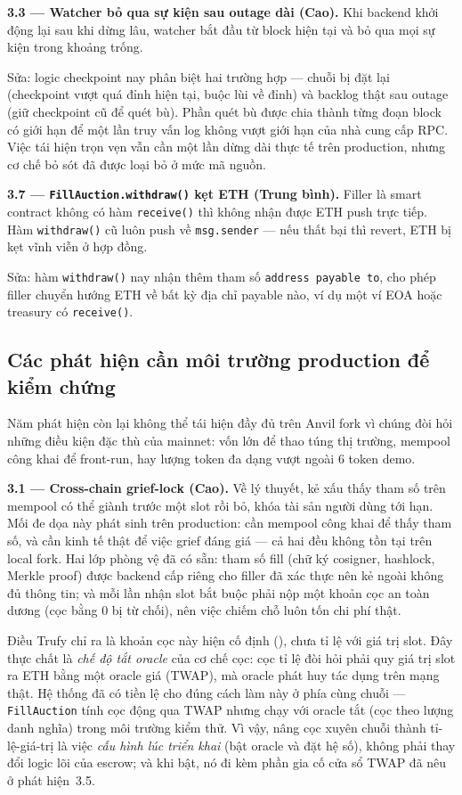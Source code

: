 \documentclass[../DoAn.tex]{subfiles}
\begin{document}
\textbf{3.3 --- Watcher bỏ qua sự kiện sau outage dài (Cao).}
Khi backend khởi động lại sau khi dừng lâu, watcher bắt đầu từ block hiện tại và bỏ qua mọi sự kiện trong khoảng trống.

Sửa: logic checkpoint nay phân biệt hai trường hợp --- chuỗi bị đặt lại (checkpoint vượt quá đỉnh hiện tại, buộc lùi về đỉnh) và backlog thật sau outage (giữ checkpoint cũ để quét bù). Phần quét bù được chia thành từng đoạn block có giới hạn để một lần truy vấn log không vượt giới hạn của nhà cung cấp RPC. Việc tái hiện trọn vẹn vẫn cần một lần dừng dài thực tế trên production, nhưng cơ chế bỏ sót đã được loại bỏ ở mức mã nguồn.

\textbf{3.7 --- \texttt{FillAuction.withdraw()} kẹt ETH (Trung bình).}
Filler là smart contract không có hàm \texttt{receive()} thì không nhận được ETH push trực tiếp. Hàm \texttt{withdraw()} cũ luôn push về \texttt{msg.sender} --- nếu thất bại thì revert, ETH bị kẹt vĩnh viễn ở hợp đồng.

Sửa: hàm \texttt{withdraw()} nay nhận thêm tham số \texttt{address payable to}, cho phép filler chuyển hướng ETH về bất kỳ địa chỉ payable nào, ví dụ một ví EOA hoặc treasury có \texttt{receive()}.
\subsection{Các phát hiện cần môi trường production để kiểm chứng}

Năm phát hiện còn lại không thể tái hiện đầy đủ trên Anvil fork vì chúng đòi hỏi những điều kiện đặc thù của mainnet: vốn lớn để thao túng thị trường, mempool công khai để front-run, hay lượng token đa dạng vượt ngoài 6 token demo.

\textbf{3.1 --- Cross-chain grief-lock (Cao).} Về lý thuyết, kẻ xấu thấy tham số  trên mempool có thể giành trước một slot rồi bỏ, khóa tài sản người dùng tới hạn. Mối đe dọa này phát sinh trên production: cần mempool công khai để thấy tham số, và cần kinh tế thật để việc grief đáng giá --- cả hai đều không tồn tại trên local fork. Hai lớp phòng vệ đã có sẵn: tham số fill (chữ ký cosigner, hashlock, Merkle proof) được backend cấp riêng cho filler đã xác thực nên kẻ ngoài không đủ thông tin; và mỗi lần nhận slot bắt buộc phải nộp một khoản cọc an toàn dương (cọc bằng 0 bị từ chối), nên việc chiếm chỗ luôn tốn chi phí thật.

Điều Trufy chỉ ra là khoản cọc này hiện cố định (), chưa tỉ lệ với giá trị slot. Đây thực chất là \emph{chế độ tắt oracle} của cơ chế cọc: cọc tỉ lệ đòi hỏi phải quy giá trị slot ra ETH bằng một oracle giá (TWAP), mà oracle phát huy tác dụng trên mạng thật. Hệ thống đã có tiền lệ cho đúng cách làm này ở phía cùng chuỗi --- \texttt{FillAuction} tính cọc động qua TWAP nhưng chạy với oracle tắt (cọc theo lượng danh nghĩa) trong môi trường kiểm thử. Vì vậy, nâng cọc xuyên chuỗi thành tỉ-lệ-giá-trị là việc \emph{cấu hình lúc triển khai} (bật oracle và đặt hệ số), không phải thay đổi logic lõi của escrow; và khi bật, nó đi kèm phần gia cố cửa sổ TWAP đã nêu ở phát hiện~3.5.
\end{document}
